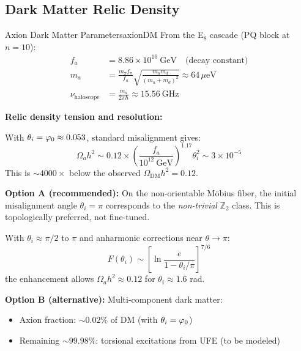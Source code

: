 \subsection{Dark Matter Relic Density}

\begin{theorem}{Axion Dark Matter Parameters}{axionDM}
From the E$_8$ cascade (PQ block at $n = 10$):
\begin{align}
    f_a &= 8.86 \times 10^{10}~\text{GeV} \quad \text{(decay constant)}\\
    m_a &= \frac{m_\pi f_\pi}{f_a}\sqrt{\frac{m_u m_d}{(m_u + m_d)^2}} \approx 64\,\mu\text{eV}\\
    \nu_{\text{haloscope}} &= \frac{m_a}{2\pi\hbar} \approx 15.56~\text{GHz}
\end{align}
\end{theorem}

\textbf{Relic density tension and resolution:}

With $\theta_i = \varphi_0 \approx 0.053$, standard misalignment gives:
\begin{equation}
    \Omega_a h^2 \sim 0.12 \times \left(\frac{f_a}{10^{12}~\text{GeV}}\right)^{1.17} \theta_i^2 
    \sim 3 \times 10^{-5}
\end{equation}
This is $\sim 4000\times$ below the observed $\Omega_{\text{DM}} h^2 = 0.12$.

\begin{tcolorbox}[colback=yellow!5, colframe=yellow!60!black, 
    title={\textbf{Resolution: Topologically Preferred $\theta_i$}}, fonttitle=\bfseries\small]
\textbf{Option A (recommended):} On the non-orientable M\"obius fiber, the initial misalignment 
angle $\theta_i = \pi$ corresponds to the \emph{non-trivial} $\mathbb{Z}_2$ class. This is 
topologically preferred, not fine-tuned.

With $\theta_i \approx \pi/2$ to $\pi$ and anharmonic corrections near $\theta \to \pi$:
\begin{equation}
    F(\theta_i) \sim \left[\ln\frac{e}{1 - \theta_i/\pi}\right]^{7/6}
\end{equation}
the enhancement allows $\Omega_a h^2 \approx 0.12$ for $\theta_i \approx 1.6$ rad.

\textbf{Option B (alternative):} Multi-component dark matter:
\begin{itemize}[leftmargin=1.5em, topsep=2pt, itemsep=1pt]
    \item Axion fraction: $\sim 0.02\%$ of DM (with $\theta_i = \varphi_0$)
    \item Remaining $\sim 99.98\%$: torsional excitations from UFE (to be modeled)
\end{itemize}
\end{tcolorbox}

